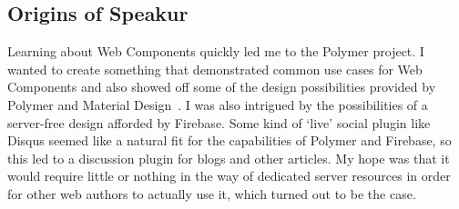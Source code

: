 \subsection{Origins of Speakur}
Learning about Web Components quickly led me to the Polymer project.
I wanted to create something that demonstrated common use cases for Web Components and also showed off some of the design possibilities provided by Polymer and 
Material Design~\cite{imura2015}.
I was also intrigued by the possibilities of a server-free design afforded by Firebase.
Some kind of `live' social plugin like Disqus seemed like a natural fit for the capabilities of Polymer and Firebase, so this led to a discussion plugin for blogs and other articles.
My hope was that it would require little or nothing in the way of dedicated server resources in order for other web authors to actually use it, 
which turned out to be the case. 

